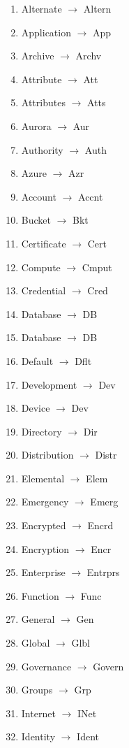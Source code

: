 \documentclass[12pt]{article}
\begin{document}
{\tiny
  \begin{multicols}{3}
    \begin{enumerate}
    \item Alternate $\rightarrow$  Altern
    \item Application $\rightarrow$  App
    \item Archive $\rightarrow$  Archv
    \item Attribute $\rightarrow$  Att
    \item Attributes $\rightarrow$  Atts
    \item Aurora $\rightarrow$  Aur
    \item Authority $\rightarrow$  Auth
    \item Azure $\rightarrow$  Azr
    \item Account $\rightarrow$  Accnt
    \item Bucket $\rightarrow$  Bkt
    \item Certificate $\rightarrow$  Cert
    \item Compute $\rightarrow$  Cmput
    \item Credential $\rightarrow$  Cred
    \item Database $\rightarrow$  DB
    \item Database $\rightarrow$  DB
    \item Default $\rightarrow$  Dflt
    \item Development $\rightarrow$  Dev
    \item Device $\rightarrow$  Dev
    \item Directory $\rightarrow$  Dir
    \item Distribution $\rightarrow$  Distr
    \item Elemental $\rightarrow$  Elem
    \item Emergency $\rightarrow$  Emerg
    \item Encrypted $\rightarrow$  Encrd
    \item Encryption $\rightarrow$  Encr
    \item Enterprise $\rightarrow$  Entrprs
    \item Function $\rightarrow$  Func
    \item General $\rightarrow$  Gen
    \item Global $\rightarrow$  Glbl
    \item Governance $\rightarrow$  Govern
    \item Groups $\rightarrow$  Grp
    \item Internet $\rightarrow$  INet
    \item Identity $\rightarrow$  Ident

\end{enumerate}
\end{multicols}}
\end{document}
